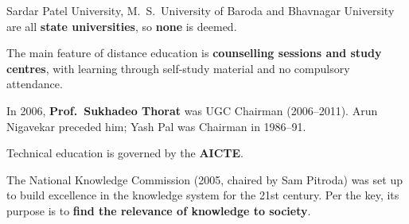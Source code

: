 Sardar Patel University, M.~S.~University of Baroda and Bhavnagar University are all \textbf{state universities}, so \textbf{none} is deemed.

The main feature of distance education is \textbf{counselling sessions and study centres}, with learning through self-study material and no compulsory attendance.

In 2006, \textbf{Prof.\ Sukhadeo Thorat} was UGC Chairman (2006--2011). Arun Nigavekar preceded him; Yash Pal was Chairman in 1986--91.

Technical education is governed by the \textbf{AICTE}.

The National Knowledge Commission (2005, chaired by Sam Pitroda) was set up to build excellence in the knowledge system for the 21st century. Per the key, its purpose is to \textbf{find the relevance of knowledge to society}.

